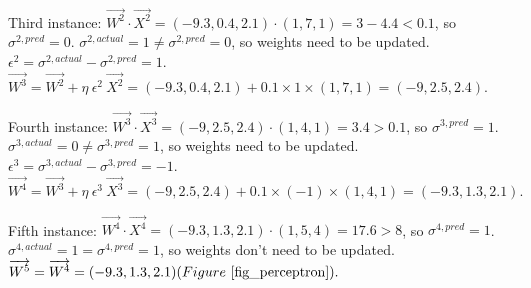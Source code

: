 \begin{tcolorbox}[colback=white,colframe=black, colbacktitle=white, coltitle=black, breakable, title=\textbf{Example 1} Perceptron, label=example1]
      Third instance: \(\overrightarrow{W^2} \cdot \overrightarrow{X^2} = (-9.3,0.4,2.1) \cdot (1,7,1) = 3-4.4 < 0.1\), so $\sigma^{2, pred} = 0$. \newline
      \(\sigma^{2, actual} = 1 \neq \sigma^{2, pred} = 0\), so weights need to be updated.\newline 
      \(\epsilon^2 = \sigma^{2,actual} - \sigma^{2,pred} = 1\).\newline
      \(\overrightarrow{W^3} = \overrightarrow{W^2} + \eta \ \epsilon^2 \ \overrightarrow{X^2} = (-9.3,0.4,2.1) + 0.1 \times 1 \times (1,7,1) = (-9,2.5,2.4).\)\newline
      
      Fourth instance: \(\overrightarrow{W^3} \cdot \overrightarrow{X^3} = (-9,2.5,2.4) \cdot (1,4,1) = 3.4 > 0.1\), so $\sigma^{3, pred} = 1$. \newline
      \(\sigma^{3, actual} = 0 \neq \sigma^{3, pred} = 1\), so weights need to be updated.\newline
      \(\epsilon^3 = \sigma^{3,actual} - \sigma^{3,pred} = -1\).\newline
      \(\overrightarrow{W^4} = \overrightarrow{W^3} + \eta \ \epsilon^3 \ \overrightarrow{X^3} = (-9,2.5,2.4) + 0.1 \times (-1) \times (1,4,1) = (-9.3,1.3,2.1).\)\newline
      
      \newpage

      Fifth instance: \(\overrightarrow{W^4} \cdot \overrightarrow{X^4} = (-9.3,1.3,2.1) \cdot (1, 5, 4) = 17.6 > 8\), so $\sigma^{4, pred} = 1$. \newline
      \(\sigma^{4, actual} = 1 = \sigma^{4, pred} = 1\), so weights don't need to be updated.\newline
      \(\overrightarrow{W^5} = \overrightarrow{W^4} = (-9.3,1.3,2.1) (Figure~\ref{fig_perceptron}). \)\newline


\end{tcolorbox}
